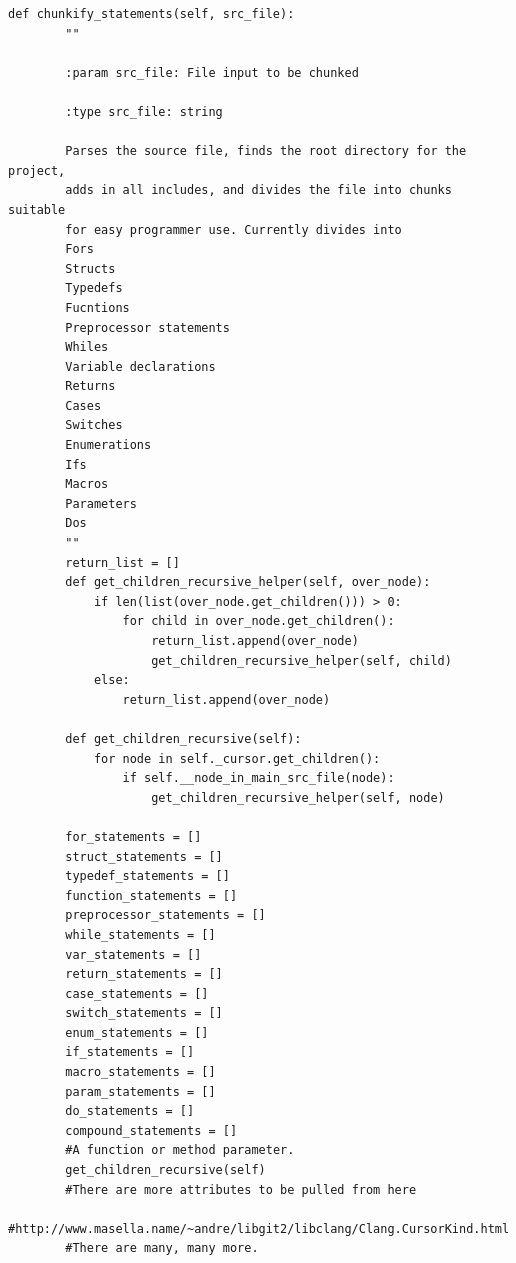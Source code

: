 \documentclass[11pt]{scrreprt}
\begin{document}
\begin{lstlisting}[frame=single,basicstyle=\small]
    def chunkify_statements(self, src_file):
        ""

        :param src_file: File input to be chunked

        :type src_file: string

        Parses the source file, finds the root directory for the project,
        adds in all includes, and divides the file into chunks suitable
        for easy programmer use. Currently divides into
        Fors
        Structs
        Typedefs
        Fucntions
        Preprocessor statements
        Whiles
        Variable declarations
        Returns
        Cases
        Switches
        Enumerations
        Ifs
        Macros
        Parameters
        Dos
        ""
        return_list = []
        def get_children_recursive_helper(self, over_node):
            if len(list(over_node.get_children())) > 0:
                for child in over_node.get_children():
                    return_list.append(over_node)
                    get_children_recursive_helper(self, child)
            else:
                return_list.append(over_node)

        def get_children_recursive(self):
            for node in self._cursor.get_children():
                if self.__node_in_main_src_file(node):
                    get_children_recursive_helper(self, node)

        for_statements = []
        struct_statements = []
        typedef_statements = []
        function_statements = []
        preprocessor_statements = []
        while_statements = []
        var_statements = []
        return_statements = []
        case_statements = []
        switch_statements = []
        enum_statements = []
        if_statements = []
        macro_statements = []
        param_statements = []
        do_statements = []
        compound_statements = []
        #A function or method parameter.
        get_children_recursive(self)
        #There are more attributes to be pulled from here
        #http://www.masella.name/~andre/libgit2/libclang/Clang.CursorKind.html
        #There are many, many more.


\end{lstlisting}
\end{document}

